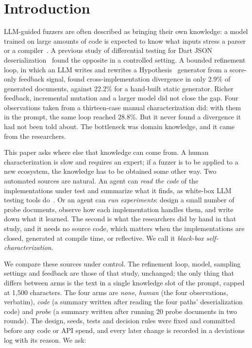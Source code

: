 \section{Introduction}

LLM-guided fuzzers are often described as bringing their own knowledge: a
model trained on large amounts of code is expected to know what inputs
stress a parser or a compiler~\cite{deng2023titanfuzz,xia2024fuzz4all}. A
previous study of differential testing for Dart JSON
deserialization~\dartcite{} found the opposite in a controlled setting. A
bounded refinement loop, in which an LLM writes and rewrites a
Hypothesis~\cite{maciver2019hypothesis} generator from a score-only
feedback signal, found cross-implementation divergence in only 2.9\% of
generated documents, against 22.2\% for a hand-built static generator.
Richer feedback, incremental mutation and a larger model did not close the
gap. Four observations taken from a thirteen-case manual characterization
did: with them in the prompt, the same loop reached 28.8\%. But it never
found a divergence it had not been told about. The bottleneck was domain
knowledge, and it came from the researchers.

This paper asks where else that knowledge can come from. A human
characterization is slow and requires an expert; if a fuzzer is to be
applied to a new ecosystem, the knowledge has to be obtained some other way.
Two automated sources are natural. An agent can \emph{read the code} of the
implementations under test and summarize what it finds, as white-box LLM
testing tools do~\cite{yang2024whitefox,yang2025kernelgpt,vadayath2026aijon}.
Or an agent can \emph{run experiments}: design a small number of probe
documents, observe how each implementation handles them, and write down what
it learned. The second is what the researchers did by hand in that study, and it
needs no source code, which matters when the implementations are closed,
generated at compile time, or reflective. We call it \emph{black-box
self-characterization}.

We compare these sources under control. The refinement loop, model,
sampling settings and feedback are those of that study, unchanged;
the only thing that differs between arms is the text in a single knowledge
slot of the prompt, capped at 1{,}500 characters. The four arms are
\emph{none}, \emph{human} (the four observations, verbatim),
\emph{code} (a summary written after reading the four paths'
deserialization code) and \emph{probe} (a summary written after running 20
probe documents in two rounds). The design, seeds, tests and decision rules
were fixed and committed before any code or API spend, and every later
change is recorded in a deviations log with its reason. We ask:

